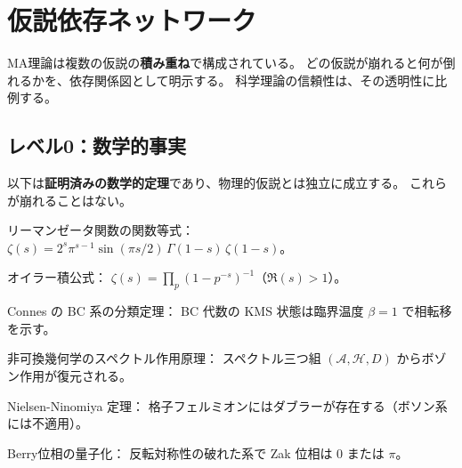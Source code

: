 
\chapter{仮説依存ネットワーク}
\label{ch:dependency}

\begin{keyresult}[本章の主題]
MA理論は複数の仮説の\textbf{積み重ね}で構成されている。
どの仮説が崩れると何が倒れるかを、依存関係図として明示する。
科学理論の信頼性は、その透明性に比例する。
\end{keyresult}

\section{レベル0：数学的事実}
\label{sec:17.1}

以下は\textbf{証明済みの数学的定理}であり、物理的仮説とは独立に成立する。
これらが崩れることはない。

\begin{dfnbox}[数学的事実 M1--M6]
\begin{description}[style=nextline, leftmargin=1.5cm]
  \item[M1] リーマンゼータ関数の関数等式：
    $\zeta(s) = 2^s \pi^{s-1}\sin(\pi s/2)\,\Gamma(1-s)\,\zeta(1-s)$。
  \item[M2] オイラー積公式：
    $\zeta(s) = \prod_p (1-p^{-s})^{-1}$（$\Re(s) > 1$）。
  \item[M3] Connes の BC 系の分類定理：
    BC 代数の KMS 状態は臨界温度 $\beta = 1$ で相転移を示す。
  \item[M4] 非可換幾何学のスペクトル作用原理：
    スペクトル三つ組 $(\mathcal{A}, \mathcal{H}, D)$ からボゾン作用が復元される。
  \item[M5] Nielsen-Ninomiya 定理：
    格子フェルミオンにはダブラーが存在する（ボソン系には不適用）。
  \item[M6] Berry位相の量子化：
    反転対称性の破れた系で Zak 位相は $0$ または $\pi$。
\end{description}
\end{dfnbox}

